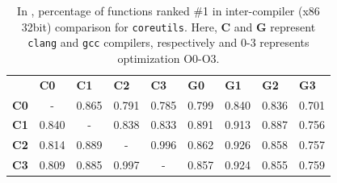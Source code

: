 \vspace{2mm}
\noindent{}



\begin{table}[t]
\scriptsize
\centering
\caption{In \toolNew, percentage of functions ranked \#1 in inter-compiler (x86 32bit) comparison for \texttt{coreutils}. Here, \textbf{C} and \textbf{G} represent \texttt{clang} and \texttt{gcc} compilers, respectively and 0-3 represents optimization O0-O3. }
\label{tab:new_cross-comp-inter}
\begin{tabular}{@{}lllllllll@{}}
\textbf{} & \textbf{C0} & \textbf{C1} & \textbf{C2} & \textbf{C3} & \textbf{G0} & \textbf{G1} & \textbf{G2} & \textbf{G3} \\ \cmidrule(l){2-9}
\multicolumn{1}{l|}{\textbf{C0}} & \multicolumn{1}{c|}{-} & \multicolumn{1}{l|}{0.865} & \multicolumn{1}{l|}{0.791} & \multicolumn{1}{l|}{0.785} & \multicolumn{1}{l|}{0.799} & \multicolumn{1}{l|}{0.840} & \multicolumn{1}{l|}{0.836} & \multicolumn{1}{l|}{0.701} \\ \cmidrule(l){2-9}
\multicolumn{1}{l|}{\textbf{C1}} & \multicolumn{1}{l|}{0.840} & \multicolumn{1}{c|}{-} & \multicolumn{1}{l|}{0.838} & \multicolumn{1}{l|}{0.833} & \multicolumn{1}{l|}{0.891} & \multicolumn{1}{l|}{0.913} & \multicolumn{1}{l|}{0.887} & \multicolumn{1}{l|}{0.756} \\ \cmidrule(l){2-9}
\multicolumn{1}{l|}{\textbf{C2}} & \multicolumn{1}{l|}{\cellcolor[HTML]{EFEFEF}0.814} & \multicolumn{1}{l|}{\cellcolor[HTML]{EFEFEF}0.889} & \multicolumn{1}{c|}{\cellcolor[HTML]{EFEFEF}-} & \multicolumn{1}{l|}{\cellcolor[HTML]{EFEFEF}0.996} & \multicolumn{1}{l|}{\cellcolor[HTML]{EFEFEF}0.862} & \multicolumn{1}{l|}{\cellcolor[HTML]{EFEFEF}0.926} & \multicolumn{1}{l|}{\cellcolor[HTML]{EFEFEF}0.858} & \multicolumn{1}{l|}{\cellcolor[HTML]{EFEFEF}0.757} \\ \cmidrule(l){2-9}
\multicolumn{1}{l|}{\textbf{C3}} & \multicolumn{1}{l|}{0.809} & \multicolumn{1}{l|}{0.885} & \multicolumn{1}{l|}{0.997} & \multicolumn{1}{c|}{-} & \multicolumn{1}{l|}{0.857} & \multicolumn{1}{l|}{0.924} & \multicolumn{1}{l|}{0.855} & \multicolumn{1}{l|}{0.759} \\ \cmidrule(l){2-9}

\end{tabular}
\end{table}
